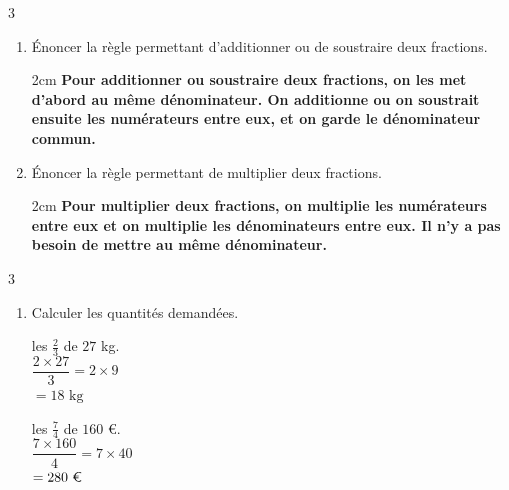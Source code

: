 \documentclass[a4paper]{book}
\begin{document}
{\newpage
\setcounter{exo}{0}

    \TableauCompetencesCinq
        {}
        {}
        {}
        {}
        {}

    \vspace{0.5cm}
    
    \begin{exerciceNote}{3}
        \begin{enumerate}
            \item Énoncer la règle permettant d'additionner ou de soustraire deux fractions.
            \begin{ZoneReponse}{2cm}
                \color{red}\bfseries
                Pour additionner ou soustraire deux fractions, on les met d'abord au même dénominateur. On additionne ou on soustrait ensuite les numérateurs entre eux, et on garde le dénominateur commun.
            \end{ZoneReponse}

            \item Énoncer la règle permettant de multiplier deux fractions.
            \begin{ZoneReponse}{2cm}
                \color{red}\bfseries
                Pour multiplier deux fractions, on multiplie les numérateurs entre eux et on multiplie les dénominateurs entre eux. Il n'y a pas besoin de mettre au même dénominateur.
            \end{ZoneReponse}
        \end{enumerate}
    \end{exerciceNote}
    
    \begin{exerciceNote}{3}
        \begin{enumerate}
            \item Calculer les quantités demandées.
            
            \begin{minipage}[t]{0.23\textwidth}
                les $\frac{2}{3}$ de $27$ kg. \\
                \color{red}\bfseries
                $\dfrac{2 \times 27}{3} = 2 \times 9$ \\
                $= 18\text{ kg}$
            \vspace{1.3cm}
            \end{minipage}\hfill \vline \hfill
            \begin{minipage}[t]{0.23\textwidth}
                \raggedright
                les $\frac{7}{4}$ de $160$ \euro. \\
                \color{red}\bfseries
                $\dfrac{7 \times 160}{4} = 7 \times 40$ \\
                $= 280\text{ \euro}$
                \vspace{1.3cm}
            \end{minipage}


\end{enumerate}
\end{exerciceNote}}
\end{document}
